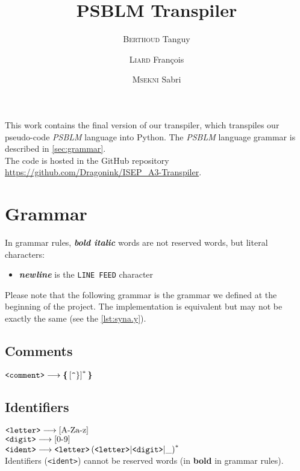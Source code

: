 \documentclass[a4paper,12pt,notitlepage,english]{article}
\title{\textbf{PSBLM} Transpiler}
\author{\textsc{Berthoud} Tanguy \and \textsc{Liard} François \and \textsc{Msekni} Sabri}
\begin{document}
  \maketitle

  This work contains the final version of our transpiler, which transpiles our pseudo-code \emph{PSBLM} language into Python.
  The \emph{PSBLM} language grammar is described in \autoref{sec:grammar}.\\

  \noindent The code is hosted in the GitHub repository \url{https://github.com/Dragonink/ISEP_A3-Transpiler}.

  \tableofcontents\newpage

  \section{Grammar}\label{sec:grammar}

  In grammar rules, \emph{\bfseries bold italic} words are not reserved words, but literal characters: \begin{itemize}
    \item \emph{\bfseries newline} is the \verb+LINE FEED+ character
  \end{itemize}

  Please note that the following grammar is the grammar we defined at the beginning of the project.
  The implementation is equivalent but may not be exactly the same (see the \autoref{lst:syna.y}).

  \subsection{Comments}

  \(\verb+<comment>+ \longrightarrow \text{\bfseries \{} \left[\verb+^+\}\right]^* \text{\bfseries \}}\)

  \subsection{Identifiers}

  \(\verb+<letter>+ \longrightarrow \left[\text{A-Za-z}\right]\)\\
  \(\verb+<digit>+ \longrightarrow \left[\text{0-9}\right]\)\\
  \(\verb+<ident>+ \longrightarrow \verb+<letter>+ \left(\verb+<letter>+ | \verb+<digit>+ | \_\right)^*\)\\

  \noindent Identifiers (\verb+<ident>+) cannot be reserved words (in \textbf{bold} in grammar rules).
\end{document}
